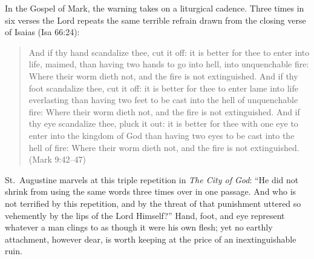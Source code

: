 In the Gospel of Mark, the warning takes on a liturgical cadence. Three times in six verses the Lord repeats the same terrible refrain drawn from the closing verse of Isaias (Isa 66:24):

\begin{quote}
And if thy hand scandalize thee, cut it off: it is better for thee to enter into life, maimed, than having two hands to go into hell, into unquenchable fire: Where their worm dieth not, and the fire is not extinguished. And if thy foot scandalize thee, cut it off: it is better for thee to enter lame into life everlasting than having two feet to be cast into the hell of unquenchable fire: Where their worm dieth not, and the fire is not extinguished. And if thy eye scandalize thee, pluck it out: it is better for thee with one eye to enter into the kingdom of God than having two eyes to be cast into the hell of fire: Where their worm dieth not, and the fire is not extinguished. (Mark 9:42--47)
\end{quote}

St.\ Augustine marvels at this triple repetition in \textit{The City of God}: ``He did not shrink from using the same words three times over in one passage. And who is not terrified by this repetition, and by the threat of that punishment uttered so vehemently by the lips of the Lord Himself?'' Hand, foot, and eye represent whatever a man clings to as though it were his own flesh; yet no earthly attachment, however dear, is worth keeping at the price of an inextinguishable ruin.

